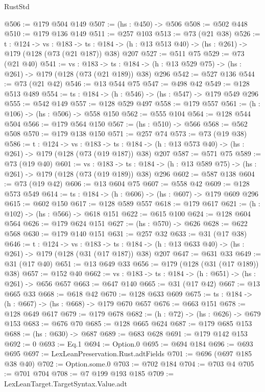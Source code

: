 \begin{lexlean}{RustStd}
\begin{coremodule}
{\begin{coremodule}
{{{{{@506 := @179 @504 @149
@507 := (hs : @450) -> @506
@508 := @502 @448
@510 := @179 @136 @149
@511 := @257 @103
@513 := @73 (@21 @38)
@526 := {t : @124} ->
  {vs : @183} ->
  {ts : @184} -> (h : @13 @513 @40) -> (hs : @261) -> @179 (@128 (@73 (@21 @187)) @38) @207
@527 := @511 @75
@529 := @73 (@21 @40)
@541 := {vs : @183} ->
  {ts : @184} -> (h : @13 @529 @75) -> (hs : @261) -> @179 (@128 (@73 (@21 @189)) @38) @296
@542 := @527 @136
@544 := @73 (@21 @42)
@546 := @13 @544 @75
@547 := @498 @42
@549 := @128 @513 @489
@554 := {ts : @184} -> (h : @546) -> (hs : @547) -> @179 @549 @296
@555 := @542 @149
@557 := @128 @529 @497
@558 := @179 @557
@561 := (h : @106) -> (hs : @506) -> @558 @150
@562 := @555 @104
@564 := @128 @544 @504
@566 := @179 @564 @150
@567 := (hs : @510) -> @566
@568 := @562 @508
@570 := @179 @138 @150
@571 := @257 @74
@573 := @73 (@19 @38)
@586 := {t : @124} ->
  {vs : @183} ->
  {ts : @184} -> (h : @13 @573 @40) -> (hs : @261) -> @179 (@128 (@73 (@19 @187)) @38) @207
@587 := @571 @75
@589 := @73 (@19 @40)
@601 := {vs : @183} ->
  {ts : @184} -> (h : @13 @589 @75) -> (hs : @261) -> @179 (@128 (@73 (@19 @189)) @38) @296
@602 := @587 @138
@604 := @73 (@19 @42)
@606 := @13 @604 @75
@607 := @558 @42
@609 := @128 @573 @549
@614 := {ts : @184} -> (h : @606) -> (hs : @607) -> @179 @609 @296
@615 := @602 @150
@617 := @128 @589 @557
@618 := @179 @617
@621 := (h : @102) -> (hs : @566) -> @618 @151
@622 := @615 @100
@624 := @128 @604 @564
@626 := @179 @624 @151
@627 := (hs : @570) -> @626
@628 := @622 @568
@630 := @179 @140 @151
@631 := @257 @32
@633 := @31 (@17 @38)
@646 := {t : @124} ->
  {vs : @183} ->
  {ts : @184} -> (h : @13 @633 @40) -> (hs : @261) -> @179 (@128 (@31 (@17 @187)) @38) @207
@647 := @631 @33
@649 := @31 (@17 @40)
@651 := @13 @649 @33
@656 := @179 (@128 (@31 (@17 @189)) @38)
@657 := @152 @40
@662 := {vs : @183} -> {ts : @184} -> (h : @651) -> (hs : @261) -> @656 @657
@663 := @647 @140
@665 := @31 (@17 @42)
@667 := @13 @665 @33
@668 := @618 @42
@670 := @128 @633 @609
@675 := {ts : @184} -> (h : @667) -> (hs : @668) -> @179 @670 @657
@676 := @663 @151
@678 := @128 @649 @617
@679 := @179 @678
@682 := (h : @72) -> (hs : @626) -> @679 @153
@683 := @676 @70
@685 := @128 @665 @624
@687 := @179 @685 @153
@688 := (hs : @630) -> @687
@689 := @683 @628
@691 := @179 @142 @153
@692 := 0
@693 := Eq.{1}
@694 := Option.{0}
@695 := @694 @184
@696 := @693 @695
@697 := LexLeanPreservation.Rust.adtFields
@701 := @696 (@697 @185 @38 @40)
@702 := Option.some.{0}
@703 := @702 @184
@704 := @703 @4
@705 := @701 @704
@708 := @7 @199 @193 @185
@709 := LexLeanTarget.TargetSyntax.Value.adt
}}}}}
\end{coremodule}}
\end{coremodule}
\end{lexlean}
